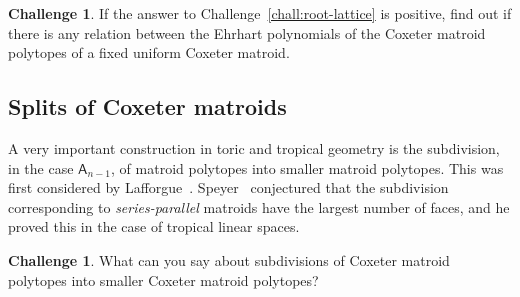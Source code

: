 \documentclass[11pt]{amsart}
\theoremstyle{definition}
\newtheorem{challenge}[theorem]{Challenge}
\begin{document}
\begin{challenge}
  If the answer to Challenge~\ref{chall:root-lattice} is positive, find out if there is any relation between the Ehrhart polynomials of the Coxeter matroid polytopes of a fixed uniform Coxeter matroid.
\end{challenge}

\subsection{Splits of Coxeter matroids}

A very important construction in toric and tropical geometry is the
subdivision, in the case $\mathsf{A}_{n-1}$, of matroid polytopes into
smaller matroid polytopes. This was first considered by
Lafforgue~\cite{l-2003}. Speyer~\cite{speyer-2008} conjectured that
the subdivision corresponding to \emph{series-parallel} matroids have
the largest number of faces, and he proved this in the case of
tropical linear spaces.

\begin{challenge}
  What can you say about subdivisions of Coxeter
  matroid polytopes into smaller Coxeter matroid polytopes?
\end{challenge}



\end{document}
